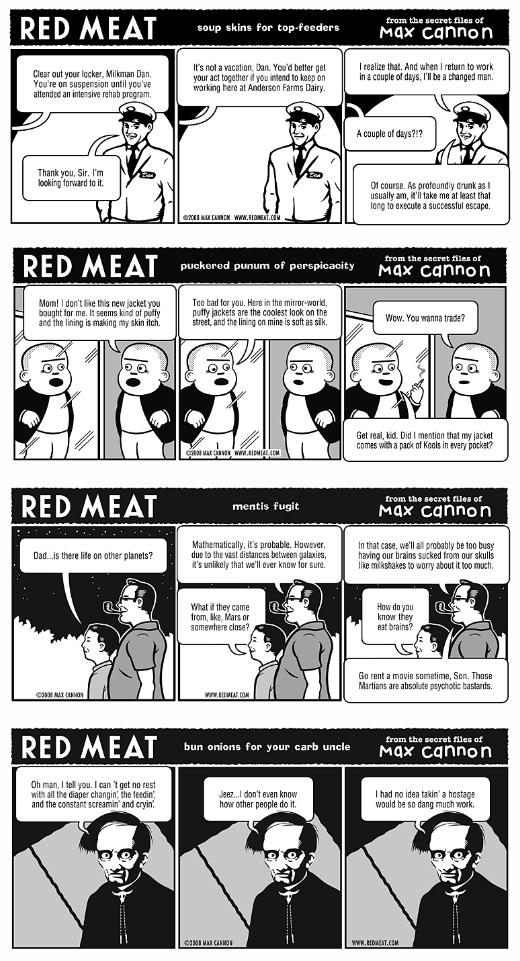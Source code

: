 \documentclass[a4paper,twoside,11pt]{article}
\begin{document}
\includegraphics[width=\textwidth]{redmeat_2008-05-06.png}



\includegraphics[width=\textwidth]{redmeat_2008-05-13.png}



\includegraphics[width=\textwidth]{redmeat_2008-05-20.png}



\includegraphics[width=\textwidth]{redmeat_2008-05-27.png}
\end{document}
